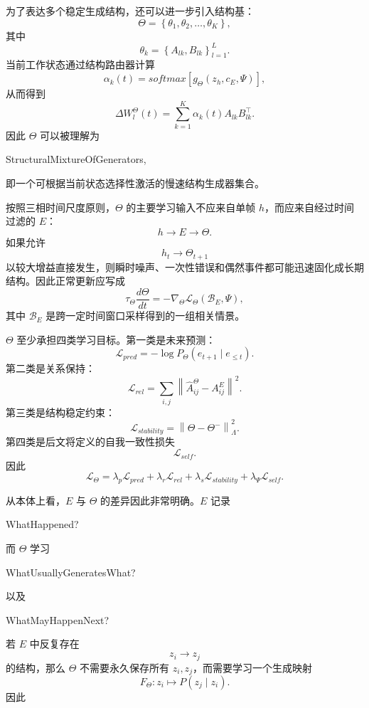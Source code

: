 为了表达多个稳定生成结构，还可以进一步引入结构基：
\[
\Theta
=
\left\{
\theta_1,\theta_2,\ldots,\theta_K
\right\},
\]
其中
\[
\theta_k
=
\left\{
A_{lk},B_{lk}
\right\}_{l=1}^{L}.
\]
当前工作状态通过结构路由器计算
\[
\alpha_k(t)
=
softmax
\left[
g_\Theta
\left(
z_h,c_E,\Psi
\right)
\right],
\]
从而得到
\[
\Delta W_l^\Theta(t)
=
\sum_{k=1}^{K}
\alpha_k(t)
A_{lk}B_{lk}^{\top}.
\]
因此 $\Theta$ 可以被理解为
\begin{statementbox}
StructuralMixtureOfGenerators,
\end{statementbox}
即一个可根据当前状态选择性激活的慢速结构生成器集合。

按照三相时间尺度原则，$\Theta$ 的主要学习输入不应来自单帧 $h$，而应来自经过时间过滤的 $E$：
\[
\boxed{
h
\rightarrow
E
\rightarrow
\Theta.
}
\]
如果允许
\[
h_t
\rightarrow
\Theta_{t+1}
\]
以较大增益直接发生，则瞬时噪声、一次性错误和偶然事件都可能迅速固化成长期结构。因此正常更新应写成
\[
\tau_\Theta
\frac{d\Theta}{dt}
=
-
\nabla_\Theta
\mathcal{L}_\Theta
\left(
\mathcal{B}_E,\Psi
\right),
\]
其中 $\mathcal{B}_E$ 是跨一定时间窗口采样得到的一组相关情景。

$\Theta$ 至少承担四类学习目标。第一类是未来预测：
\[
\mathcal{L}_{pred}
=
-
\log
P_\Theta
\left(
e_{t+1}
\mid
e_{\leq t}
\right).
\]
第二类是关系保持：
\[
\mathcal{L}_{rel}
=
\sum_{i,j}
\left\|
\widehat{A}_{ij}^\Theta
-
A_{ij}^E
\right\|^2.
\]
第三类是结构稳定约束：
\[
\mathcal{L}_{stability}
=
\left\|
\Theta-\Theta^{-}
\right\|_\Lambda^2.
\]
第四类是后文将定义的自我一致性损失
\[
\mathcal{L}_{self}.
\]
因此
\[
\mathcal{L}_\Theta
=
\lambda_p\mathcal{L}_{pred}
+
\lambda_r\mathcal{L}_{rel}
+
\lambda_s\mathcal{L}_{stability}
+
\lambda_\Psi\mathcal{L}_{self}.
\]

从本体上看，$E$ 与 $\Theta$ 的差异因此非常明确。$E$ 记录
\begin{statementbox}
WhatHappened?
\end{statementbox}
而 $\Theta$ 学习
\begin{statementbox}
WhatUsuallyGeneratesWhat?
\end{statementbox}
以及
\begin{statementbox}
WhatMayHappenNext?
\end{statementbox}
若 $E$ 中反复存在
\[
z_i\rightarrow z_j
\]
的结构，那么 $\Theta$ 不需要永久保存所有 $z_i,z_j$，而需要学习一个生成映射
\[
F_\Theta:
z_i
\mapsto
P(z_j\mid z_i).
\]
因此
\begin{statementbox}
\centering
{}
\end{statementbox}

